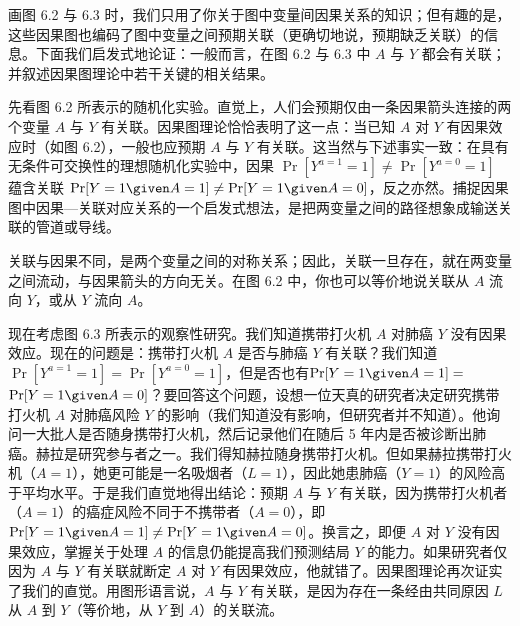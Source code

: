 \begin{figure}[htbp]
\centering
{}
\caption{}
\label{fig:6.3}
\end{figure}

画图 6.2 与 6.3 时，我们只用了你关于图中变量间因果关系的知识；但有趣的是，这些因果图也编码了图中变量之间预期关联（更确切地说，预期缺乏关联）的信息。下面我们启发式地论证：一般而言，在图 6.2 与 6.3 中 $A$ 与 $Y$ 都会有关联；并叙述因果图理论中若干关键的相关结果。

先看图 6.2 所表示的随机化实验。直觉上，人们会预期仅由一条因果箭头连接的两个变量 $A$ 与 $Y$ 有关联。因果图理论恰恰表明了这一点：当已知 $A$ 对 $Y$ 有因果效应时（如图 6.2），一般也应预期 $A$ 与 $Y$ 有关联。这当然与下述事实一致：在具有无条件可交换性的理想随机化实验中，因果 $\Pr[Y^{a=1}=1]\neq\Pr[Y^{a=0}=1]$ 蕴含关联 $\Pr[Y=1\given A=1]\neq\Pr[Y=1\given A=0]$，反之亦然。捕捉因果图中因果—关联对应关系的一个启发式想法，是把两变量之间的路径想象成输送关联的管道或导线。


关联与因果不同，是两个变量之间的对称关系；因此，关联一旦存在，就在两变量之间流动，与因果箭头的方向无关。在图 6.2 中，你也可以等价地说关联从 $A$ 流向 $Y$，或从 $Y$ 流向 $A$。

现在考虑图 6.3 所表示的观察性研究。我们知道携带打火机 $A$ 对肺癌 $Y$ 没有因果效应。现在的问题是：携带打火机 $A$ 是否与肺癌 $Y$ 有关联？我们知道 $\Pr[Y^{a=1}=1]=\Pr[Y^{a=0}=1]$，但是否也有\mbox{$\Pr[Y=1\given A=1]=$}\mbox{$\Pr[Y=1\given A=0]$}？要回答这个问题，设想一位天真的研究者决定研究携带打火机 $A$ 对肺癌风险 $Y$ 的影响（我们知道没有影响，但研究者并不知道）。他询问一大批人是否随身携带打火机，然后记录他们在随后 5 年内是否被诊断出肺癌。赫拉是研究参与者之一。我们得知赫拉随身携带打火机。但如果赫拉携带打火机（$A=1$），她更可能是一名吸烟者（$L=1$），因此她患肺癌（$Y=1$）的风险高于平均水平。于是我们直觉地得出结论：预期 $A$ 与 $Y$ 有关联，因为携带打火机者（$A=1$）的癌症风险不同于不携带者（$A=0$），即 $\Pr[Y=1\given A=1]\neq\Pr[Y=1\given A=0]$。换言之，即便 $A$ 对 $Y$ 没有因果效应，掌握关于处理 $A$ 的信息仍能提高我们预测结局 $Y$ 的能力。如果研究者仅因为 $A$ 与 $Y$ 有关联就断定 $A$ 对 $Y$ 有因果效应，他就错了。因果图理论再次证实了我们的直觉。用图形语言说，$A$ 与 $Y$ 有关联，是因为存在一条经由共同原因 $L$ 从 $A$ 到 $Y$（等价地，从 $Y$ 到 $A$）的关联流。

